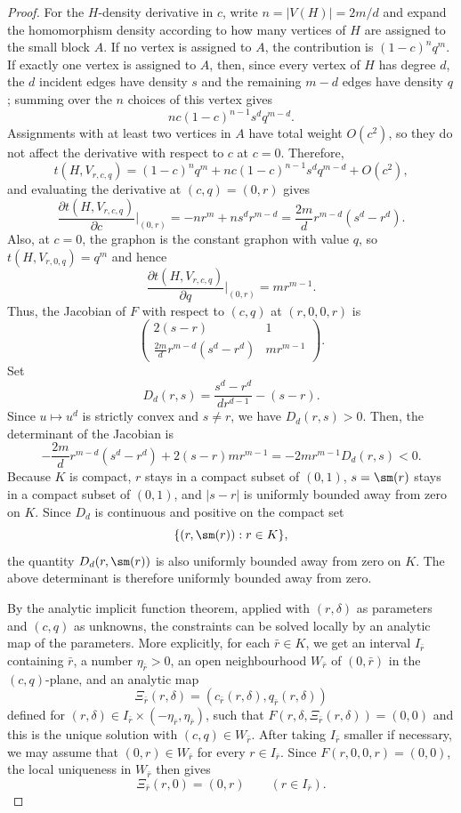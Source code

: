 \begin{proof}
For the $H$-density derivative in $c$, write $n=|V(H)|=2m/d$ and expand the
homomorphism density according to how many vertices of $H$ are assigned to the
small block $A$.  If no vertex is assigned to $A$, the contribution is
$(1-c)^nq^m$.  If exactly one vertex is assigned to $A$, then, since every
vertex of $H$ has degree $d$, the $d$ incident edges have density $s$ and the
remaining $m-d$ edges have density $q$; summing over the $n$ choices of this
vertex gives
\[
  n c(1-c)^{n-1}s^d q^{m-d}.
\]
Assignments with at least two vertices in $A$ have total weight $O(c^2)$, so
they do not affect the derivative with respect to $c$ at $c=0$.  Therefore,
\[
  t(H,V_{r,c,q})
  =
  (1-c)^nq^m
  +n c(1-c)^{n-1}s^d q^{m-d}
  +O(c^2),
\]
and evaluating the derivative at $(c,q)=(0,r)$ gives
\[
  \frac{\partial t(H,V_{r,c,q})}{\partial c}\bigg|_{(0,r)}
  =
  -nr^m+ns^d r^{m-d}
  =
  \frac{2m}{d}r^{m-d}(s^d-r^d).
\]
Also, at $c=0$, the graphon is the constant graphon with value $q$, so
$t(H,V_{r,0,q})=q^m$ and hence
\[
  \frac{\partial t(H,V_{r,c,q})}{\partial q}\bigg|_{(0,r)}=m r^{m-1}.
\]
Thus, the Jacobian of $F$ with respect to $(c,q)$ at $(r,0,0,r)$ is
\[
  \begin{pmatrix}
    2(s-r) & 1 \\
    \frac{2m}{d}r^{m-d}(s^d-r^d) & m r^{m-1}
  \end{pmatrix}.
\]
Set
\[
  D_d(r,s)=\frac{s^d-r^d}{d r^{d-1}}-(s-r).
\]
Since $u\mapsto u^d$ is strictly convex and $s\ne r$, we have $D_d(r,s)>0$.
Then, the determinant of the Jacobian is
\[
  -\frac{2m}{d}r^{m-d}(s^d-r^d)+2(s-r)m r^{m-1}
  =-2m r^{m-1}D_d(r,s)<0.
\]
Because $K$ is compact, $r$ stays in a compact subset of $(0,1)$, $s=\sm(r)$
stays in a compact subset of $(0,1)$, and $|s-r|$ is uniformly bounded away
from zero on $K$.  Since $D_d$ is continuous and positive on the compact set
\[
  \{(r,\sm(r)):r\in K\},
\]
the quantity $D_d(r,\sm(r))$ is also uniformly bounded away from zero on $K$.
The above determinant is therefore uniformly bounded away from zero.

By the analytic implicit function theorem, applied with $(r,\delta)$ as
parameters and $(c,q)$ as unknowns, the constraints can be solved locally by an
analytic map of the parameters.  More explicitly, for each $\bar r\in K$, we get an
interval $I_{\bar r}$ containing $\bar r$, a number $\eta_{\bar r}>0$, an open
neighbourhood $W_{\bar r}$ of $(0,\bar r)$ in the $(c,q)$-plane, and an analytic map
\[
  \Xi_{\bar r}(r,\delta)
  =(c_{\bar r}(r,\delta),q_{\bar r}(r,\delta))
\]
defined for $(r,\delta)\in I_{\bar r}\times(-\eta_{\bar r},\eta_{\bar r})$, such that
$F(r,\delta,\Xi_{\bar r}(r,\delta))=(0,0)$ and this is the unique solution with
$(c,q)\in W_{\bar r}$.  After taking $I_{\bar r}$ smaller if necessary, we may assume
that $(0,r)\in W_{\bar r}$ for every $r\in I_{\bar r}$.  Since
$F(r,0,0,r)=(0,0)$, the local uniqueness in $W_{\bar r}$ then gives
\[
  \Xi_{\bar r}(r,0)=(0,r)\qquad (r\in I_{\bar r}).
\]


\end{proof}
